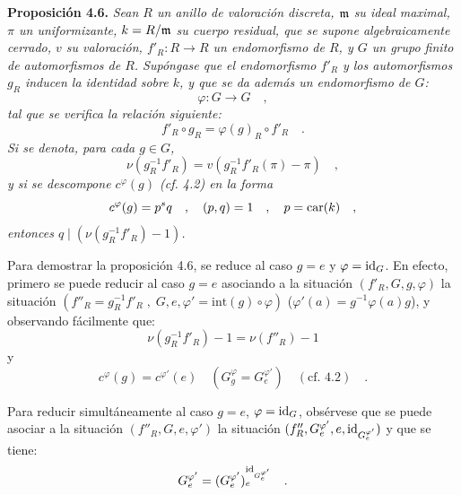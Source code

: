 \medskip
\noindent
\textbf{Proposición 4.6.} \emph{Sean $R$ un anillo de valoración discreta, $\mathfrak m$ su ideal maximal, $\pi$ un uniformizante, $k = R/\mathfrak m$ su cuerpo residual, que se supone algebraicamente cerrado, $v$ su valoración, $f'_R : R \to R$ un endomorfismo de $R$, y $G$ un grupo finito de automorfismos de $R$. Supóngase que el endomorfismo $f'_R$ y los automorfismos $g_R$ inducen la identidad sobre $k$, y que se da además un endomorfismo de $G$:
\[
\varphi : G \longrightarrow G \quad ,
\]
tal que se verifica la relación siguiente:
\[
f'_R \circ g_R = \varphi(g)_R \circ f'_R \quad .
\]
Si se denota, para cada $g \in G$,
\[
\nu(g_R^{-1}f'_R) = v(g_R^{-1}f'_R(\pi) - \pi) \quad ,
\]
y si se descompone $c^\varphi(g)$ (cf. 4.2) en la forma
\[
c^\varphi(g) = p^s q \quad , \quad (p,q) = 1 \quad , \quad p = \operatorname{car}(k) \quad ,
\]
entonces $q \mid (\nu(g_R^{-1}f'_R) - 1)$.}

\medskip

Para demostrar la proposición 4.6, se reduce al caso $g = e$ y $\varphi = \operatorname{id}_G$. En efecto, primero se puede reducir al caso $g = e$ asociando a la situación $(f'_R, G, g, \varphi)$ la situación $(f''_R = g_R^{-1}f'_R \; , \; G, e, \varphi' = \mathrm{int}(g) \circ \varphi)$ ($\varphi'(a) = g^{-1}\varphi(a)g$), y observando fácilmente que:
\[
\nu(g_R^{-1}f'_R) - 1 = \nu(f''_R) - 1
\]
y
\[
c^\varphi(g) = c^{\varphi'}(e) \quad (G_g^\varphi = G_e^{\varphi'}) \quad (\text{cf. 4.2}) \quad .
\]

Para reducir simultáneamente al caso $g = e$, $\varphi = \operatorname{id}_G$, obsérvese que se puede asociar a la situación $(f''_R, G, e, \varphi')$ la situación $(f''_R, G_e^{\varphi'}, e, \operatorname{id}_{G_e^{\varphi'}})$ y que se tiene:
\[
G_e^{\varphi'} = (G_e^{\varphi'})_e^{\operatorname{id}_{G_e^{\varphi'}}} \quad .
\]

